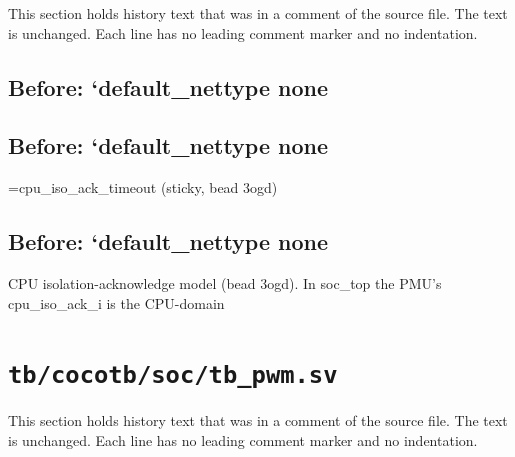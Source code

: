 This section holds history text that was in a comment of the source file. The text is unchanged. Each line has no leading comment marker and no indentation.

\begin{record}

\subsection*{Before: `default\_nettype none}


\subsection*{Before: `default\_nettype none}

\begin{textblock}
                         [3]=cpu_iso_ack_timeout (sticky, bead 3ogd)
\end{textblock}

\subsection*{Before: `default\_nettype none}

\begin{textblock}
CPU isolation-acknowledge model (bead 3ogd).  In soc_top the PMU's cpu_iso_ack_i is the CPU-domain
\end{textblock}

\end{record}

\section{\texttt{tb/cocotb/soc/tb\_pwm.sv}}\label{cr:suite:soc-tb-pwm-sv}

This section holds history text that was in a comment of the source file. The text is unchanged. Each line has no leading comment marker and no indentation.

